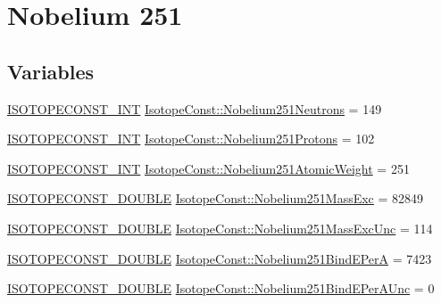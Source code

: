 \hypertarget{group___isotope_const-_nobelium-_no251}{}\section{Nobelium 251}
\label{group___isotope_const-_nobelium-_no251}
\subsection*{Variables}
\begin{DoxyCompactItemize}
\item 
\mbox{\hyperlink{group___isotope_const-_macros_ga5f18360b3e99483a35c32d789e62621c}{I\+S\+O\+T\+O\+P\+E\+C\+O\+N\+S\+T\+\_\+\+I\+NT}} \mbox{\hyperlink{group___isotope_const-_nobelium-_no251_ga6cbf0012d396d8a8a628f7ed221885ea}{Isotope\+Const\+::\+Nobelium251\+Neutrons}} = 149
\item 
\mbox{\hyperlink{group___isotope_const-_macros_ga5f18360b3e99483a35c32d789e62621c}{I\+S\+O\+T\+O\+P\+E\+C\+O\+N\+S\+T\+\_\+\+I\+NT}} \mbox{\hyperlink{group___isotope_const-_nobelium-_no251_gad11ad1ee61ad9a882c1e5a1ad13ba076}{Isotope\+Const\+::\+Nobelium251\+Protons}} = 102
\item 
\mbox{\hyperlink{group___isotope_const-_macros_ga5f18360b3e99483a35c32d789e62621c}{I\+S\+O\+T\+O\+P\+E\+C\+O\+N\+S\+T\+\_\+\+I\+NT}} \mbox{\hyperlink{group___isotope_const-_nobelium-_no251_ga77289ed06fbec93d185dd6974badbd20}{Isotope\+Const\+::\+Nobelium251\+Atomic\+Weight}} = 251
\item 
\mbox{\hyperlink{group___isotope_const-_macros_ga8f45a7272ce02c0b4c65c44636ed719a}{I\+S\+O\+T\+O\+P\+E\+C\+O\+N\+S\+T\+\_\+\+D\+O\+U\+B\+LE}} \mbox{\hyperlink{group___isotope_const-_nobelium-_no251_ga1d5cd5aa5acf83381565bdda9dd7dfb2}{Isotope\+Const\+::\+Nobelium251\+Mass\+Exc}} = 82849
\item 
\mbox{\hyperlink{group___isotope_const-_macros_ga8f45a7272ce02c0b4c65c44636ed719a}{I\+S\+O\+T\+O\+P\+E\+C\+O\+N\+S\+T\+\_\+\+D\+O\+U\+B\+LE}} \mbox{\hyperlink{group___isotope_const-_nobelium-_no251_gac68b8fa1f418c007a6cf57f786388ae0}{Isotope\+Const\+::\+Nobelium251\+Mass\+Exc\+Unc}} = 114
\item 
\mbox{\hyperlink{group___isotope_const-_macros_ga8f45a7272ce02c0b4c65c44636ed719a}{I\+S\+O\+T\+O\+P\+E\+C\+O\+N\+S\+T\+\_\+\+D\+O\+U\+B\+LE}} \mbox{\hyperlink{group___isotope_const-_nobelium-_no251_gab83c657e6d9fcdad4378d5e64ef9305b}{Isotope\+Const\+::\+Nobelium251\+Bind\+E\+PerA}} = 7423
\item 
\mbox{\hyperlink{group___isotope_const-_macros_ga8f45a7272ce02c0b4c65c44636ed719a}{I\+S\+O\+T\+O\+P\+E\+C\+O\+N\+S\+T\+\_\+\+D\+O\+U\+B\+LE}} \mbox{\hyperlink{group___isotope_const-_nobelium-_no251_gae0d14e53c6e21a21608e7980583fc9be}{Isotope\+Const\+::\+Nobelium251\+Bind\+E\+Per\+A\+Unc}} = 0

\end{DoxyCompactItemize}

